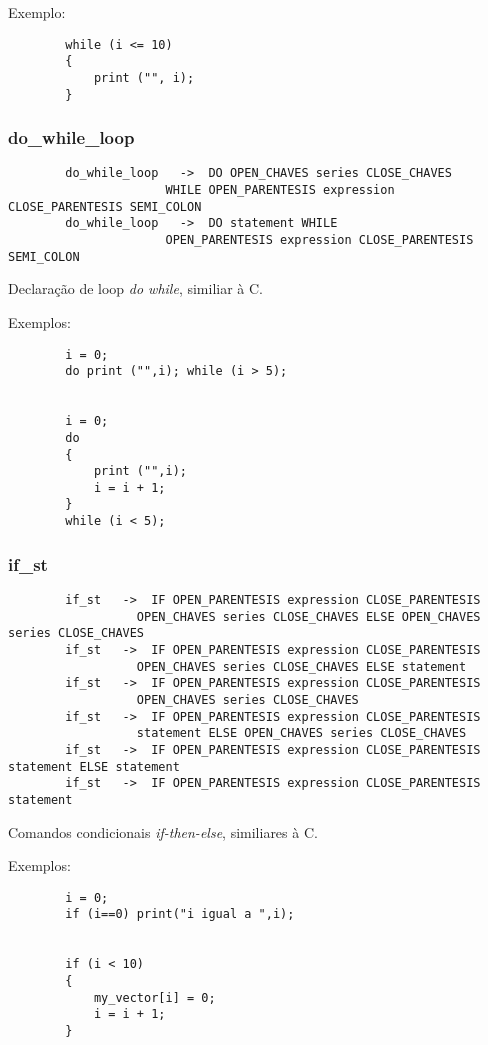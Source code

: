 \documentclass[a4paper,10pt]{article}
\begin{document}
		Exemplo:
		\begin{lstlisting}
		while (i <= 10)
		{
		    print ("", i);
		}
		\end{lstlisting}
		\vspace{10mm}
	\subsubsection{do\_while\_loop}
		\begin{lstlisting}
		do_while_loop	->	DO OPEN_CHAVES series CLOSE_CHAVES
					  WHILE OPEN_PARENTESIS expression CLOSE_PARENTESIS SEMI_COLON
		do_while_loop	->	DO statement WHILE
					  OPEN_PARENTESIS expression CLOSE_PARENTESIS SEMI_COLON
		\end{lstlisting}
		Declara\c{c}\~ao de loop \emph{do while}, similiar \`{a} C.
		
		Exemplos:
		\begin{lstlisting}
		i = 0;
		do print ("",i); while (i > 5);
		
		
		i = 0;
		do
		{
			print ("",i);
			i = i + 1;
		}
		while (i < 5);
		\end{lstlisting}
		\vspace{10mm}
	\subsubsection{if\_st}
		\begin{lstlisting}
		if_st	->	IF OPEN_PARENTESIS expression CLOSE_PARENTESIS
				  OPEN_CHAVES series CLOSE_CHAVES ELSE OPEN_CHAVES series CLOSE_CHAVES
		if_st	->	IF OPEN_PARENTESIS expression CLOSE_PARENTESIS
				  OPEN_CHAVES series CLOSE_CHAVES ELSE statement 
		if_st	->	IF OPEN_PARENTESIS expression CLOSE_PARENTESIS
				  OPEN_CHAVES series CLOSE_CHAVES
		if_st	->	IF OPEN_PARENTESIS expression CLOSE_PARENTESIS
				  statement ELSE OPEN_CHAVES series CLOSE_CHAVES
		if_st	->	IF OPEN_PARENTESIS expression CLOSE_PARENTESIS statement ELSE statement 
		if_st	->	IF OPEN_PARENTESIS expression CLOSE_PARENTESIS statement 
		\end{lstlisting}
		Comandos condicionais \emph{if-then-else}, similiares \`{a} C.
		
		Exemplos:
		\begin{lstlisting}
		i = 0;
		if (i==0) print("i igual a ",i);
		
		
		if (i < 10)
		{
			my_vector[i] = 0;
			i = i + 1;
		}
		\end{lstlisting}
		\vspace{10mm}
\end{document}
